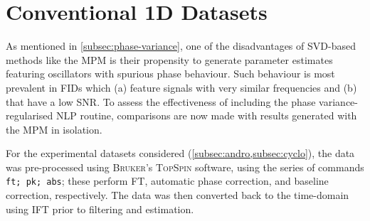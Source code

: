 \section{Conventional \ac{1D} Datasets}
\label{sec:evaluation}

As mentioned in \cref{subsec:phase-variance}, one of the disadvantages of
\ac{SVD}-based methods like the \ac{MPM} is their propensity to generate
parameter estimates featuring oscillators with spurious phase behaviour. Such
behaviour is most prevalent in \acp{FID} which (a) feature signals with very
similar frequencies and (b) that have a low \ac{SNR}.
To assess the effectiveness of including the phase variance-regularised
\ac{NLP} routine, comparisons are now made with results generated with the
\ac{MPM} in isolation.

For the experimental datasets considered (\cref{subsec:andro,subsec:cyclo}),
the data was pre-processed using \textsc{Bruker}'s \textsc{TopSpin} software,
using the series of commands \texttt{ft; pk; abs}; these perform \ac{FT},
automatic phase correction, and baseline correction, respectively. The data was
then converted back to the time-domain using \ac{IFT} prior to filtering and
estimation.

